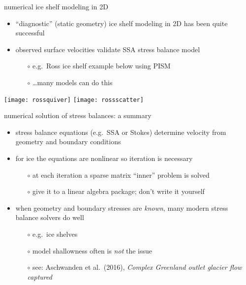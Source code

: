 \begin{frame}{numerical ice shelf modeling in 2D}

\begin{itemize}
\item ``diagnostic'' (static geometry) ice shelf modeling in 2D has been quite successful
\item observed surface velocities validate SSA stress balance model
  \begin{itemize}
  \item[$\circ$] e.g.~Ross ice shelf example below using PISM
  \item[$\circ$] \dots many models can do this
  \end{itemize}
\end{itemize}

\begin{center}
\texttt{[image: rossquiver]}  \hfill  \texttt{[image: rossscatter]}
\end{center}
\end{frame}


\begin{frame}{numerical solution of stress balances: a summary}

\begin{itemize}
\item stress balance equations (e.g.~SSA or Stokes) determine velocity from geometry and boundary conditions
\item for ice the equations are nonlinear so iteration is necessary
  \begin{itemize}
  \item[$\circ$] at each iteration a sparse matrix ``inner'' problem is solved
  \item[$\circ$] give it to a linear algebra package; don't write it yourself
  \end{itemize}
\item when geometry and boundary stresses are \emph{known}, many modern stress balance solvers do well
  \begin{itemize}
  \item[$\circ$] e.g.~ice shelves
  \item[$\circ$] model shallowness often is \emph{not} the issue
  \item[$\circ$] see: Aschwanden et al.~(2016), \emph{Complex Greenland outlet glacier flow captured}
  \end{itemize}
\end{itemize}
\end{frame}



